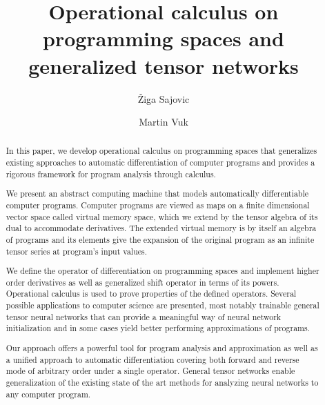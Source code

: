 \documentclass[smallcondensed]{svjour3}
\date{}
\begin{document}
\title{Operational calculus on programming spaces and generalized tensor networks}
\author{Žiga Sajovic \and Martin Vuk}
\maketitle
\vspace{-1.5cm}
\begin{abstract}
In this paper, we develop operational calculus on programming spaces that
generalizes existing approaches to automatic differentiation of computer
programs and provides a rigorous framework for program analysis through calculus. 

We present an abstract computing machine that models automatically
differentiable computer programs. Computer programs are viewed as maps on a
finite dimensional vector space called virtual memory space, which we
extend by the tensor algebra of its dual to accommodate derivatives. The
extended virtual memory is by itself an algebra of programs and its elements
give the expansion of the original program as an infinite tensor series at
program's input values.     

We define the operator of differentiation on programming spaces and
implement higher order derivatives as well as generalized shift operator in
terms of its powers. Operational calculus is used to prove properties of the
defined operators. Several possible applications to computer science are
presented, most notably trainable general tensor neural networks that can
provide a meaningful way of neural network initialization and in some cases
yield better performing approximations of programs. 


Our approach offers a powerful tool for program
analysis and approximation as well as a unified approach to automatic
differentiation covering both forward and reverse mode of arbitrary order under a single operator. General tensor networks
enable generalization of the existing state of the art methods for analyzing neural
networks to any computer program. 



\end{abstract}
\end{document}
